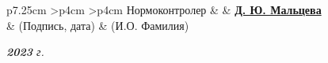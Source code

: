 \begin{titlepage}
\begin{table}[h!]
		\vspace{\baselineskip}

		\begin{signstabular}[0.7]{p{7.25cm} >{\centering\arraybackslash}p{4cm} >{\centering\arraybackslash}p{4cm}}
			Нормоконтролер & \uline{\mbox{\hspace*{4cm}}} & \uline{\hfill \textbf{Д. Ю. Мальцева} \hfill} \\
			& \scriptsize (Подпись, дата) & \scriptsize (И.О. Фамилия)
		\end{signstabular}
	\end{table}

	\vfill

	\begin{center}
		\normalsize \textit{\textbf{2023} г.}
	\end{center}
\end{titlepage}




		

